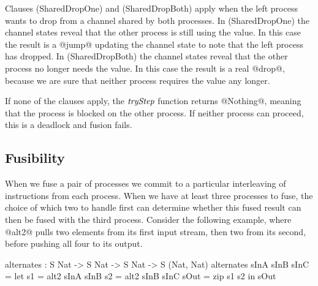Clauses (SharedDropOne) and (SharedDropBoth) apply when the left process wants to drop from a channel shared by both processes. In (SharedDropOne) the channel states reveal that the other process is still using the value. In this case the result is a @jump@ updating the channel state to note that the left process has dropped. In (SharedDropBoth) the channel states reveal that the other process no longer needs the value. In this case the result is a real @drop@, because we are sure that neither process requires the value any longer.

If none of the clauses apply, the $\textit{tryStep}$ function returns @Nothing@, meaning that the process is blocked on the other process. If neither process can proceed, this is a deadlock and fusion fails.







\subsection{Fusibility}
\label{s:FusionOrder}
When we fuse a pair of processes we commit to a particular interleaving of instructions from each process. When we have at least three processes to fuse, the choice of which two to handle first can determine whether this fused result can then be fused with the third process. Consider the following example, where @alt2@ pulls two elements from its first input stream, then two from its second, before pushing all four to its output.
\begin{code}
  alternates : S Nat -> S Nat -> S Nat -> S (Nat, Nat)
  alternates sInA sInB sInC
   = let  s1   = alt2 sInA sInB
          s2   = alt2 sInB sInC
          sOut = zip s1 s2
     in   sOut
\end{code}

